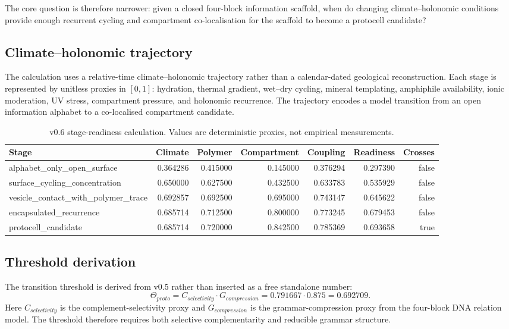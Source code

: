 \documentclass[11pt]{article}
\begin{document}
The core question is therefore narrower: given a closed four-block information scaffold, when do changing climate--holonomic conditions provide enough recurrent cycling and compartment co-localisation for the scaffold to become a protocell candidate?

\subsection{Climate--holonomic trajectory}
The calculation uses a relative-time climate--holonomic trajectory rather than a calendar-dated geological reconstruction. Each stage is represented by unitless proxies in $[0,1]$: hydration, thermal gradient, wet--dry cycling, mineral templating, amphiphile availability, ionic moderation, UV stress, compartment pressure, and holonomic recurrence. The trajectory encodes a model transition from an open information alphabet to a co-localised compartment candidate.

\begin{table}[h]
\centering
\caption{v0.6 stage-readiness calculation. Values are deterministic proxies, not empirical measurements.}
\begin{tabular}{lrrrrrr}
\hline
Stage & Climate & Polymer & Compartment & Coupling & Readiness & Crosses \\
\hline
alphabet\_only\_open\_surface & 0.364286 & 0.415000 & 0.145000 & 0.376294 & 0.297390 & false \\
surface\_cycling\_concentration & 0.650000 & 0.627500 & 0.432500 & 0.633783 & 0.535929 & false \\
vesicle\_contact\_with\_polymer\_trace & 0.692857 & 0.692500 & 0.695000 & 0.743147 & 0.645622 & false \\
encapsulated\_recurrence & 0.685714 & 0.712500 & 0.800000 & 0.773245 & 0.679453 & false \\
protocell\_candidate & 0.685714 & 0.720000 & 0.842500 & 0.785369 & 0.693658 & true \\
\hline
\end{tabular}
\end{table}

\subsection{Threshold derivation}
The transition threshold is derived from v0.5 rather than inserted as a free standalone number:
\[
\Theta_{proto} = C_{selectivity} \cdot G_{compression} = 0.791667 \cdot 0.875 = 0.692709.
\]
Here $C_{selectivity}$ is the complement-selectivity proxy and $G_{compression}$ is the grammar-compression proxy from the four-block DNA relation model. The threshold therefore requires both selective complementarity and reducible grammar structure.
\end{document}
